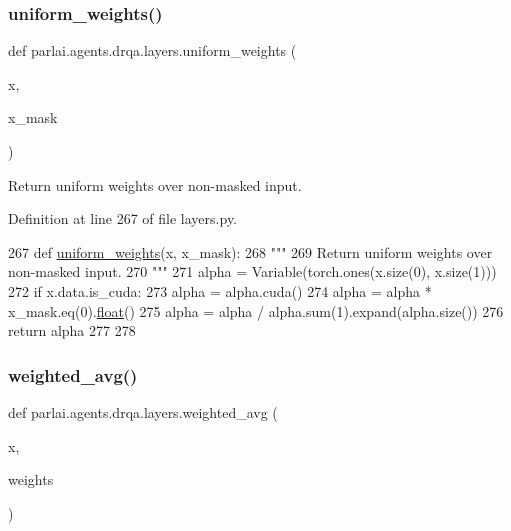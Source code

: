 \subsubsection{\texorpdfstring{uniform\+\_\+weights()}{uniform\_weights()}}
{\footnotesize\ttfamily def parlai.\+agents.\+drqa.\+layers.\+uniform\+\_\+weights (\begin{DoxyParamCaption}\item[{}]{x,  }\item[{}]{x\+\_\+mask }\end{DoxyParamCaption})}

\begin{DoxyVerb}Return uniform weights over non-masked input.
\end{DoxyVerb}
 

Definition at line 267 of file layers.\+py.


\begin{DoxyCode}
267 \textcolor{keyword}{def }\hyperlink{namespaceparlai_1_1agents_1_1drqa_1_1layers_a4ef6f28cb2997c68a15b05137b75dcc4}{uniform\_weights}(x, x\_mask):
268     \textcolor{stringliteral}{"""}
269 \textcolor{stringliteral}{    Return uniform weights over non-masked input.}
270 \textcolor{stringliteral}{    """}
271     alpha = Variable(torch.ones(x.size(0), x.size(1)))
272     \textcolor{keywordflow}{if} x.data.is\_cuda:
273         alpha = alpha.cuda()
274     alpha = alpha * x\_mask.eq(0).\hyperlink{namespaceprojects_1_1controllable__dialogue_1_1make__control__dataset_aa2b7207688c641dbc094ab44eca27113}{float}()
275     alpha = alpha / alpha.sum(1).expand(alpha.size())
276     \textcolor{keywordflow}{return} alpha
277 
278 
\end{DoxyCode}
\mbox{\label{namespaceparlai_1_1agents_1_1drqa_1_1layers_a8d0e781e00db1c2d843b21a056554f65}} 
\subsubsection{\texorpdfstring{weighted\+\_\+avg()}{weighted\_avg()}}
{\footnotesize\ttfamily def parlai.\+agents.\+drqa.\+layers.\+weighted\+\_\+avg (\begin{DoxyParamCaption}\item[{}]{x,  }\item[{}]{weights }\end{DoxyParamCaption})}

